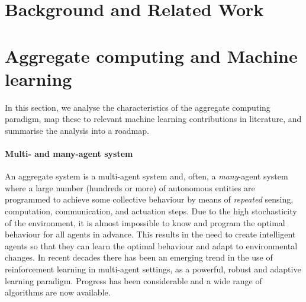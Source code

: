 \documentclass[
twocolumn,
]{ceurart}
\begin{document}

\section{Background and Related Work}

\section{Aggregate computing and Machine learning}

In this section,
 we analyse the characteristics of the aggregate computing paradigm,
 map these to relevant machine learning contributions in literature,
 and summarise the analysis into a roadmap.

\paragraph{Multi- and many-agent system}
%
An aggregate system is a multi-agent system
 and, often, a \emph{many}-agent system
 where a large number (hundreds or more)
 of autonomous entities are programmed to achieve 
 some collective behaviour by means of \emph{repeated} 
 sensing, computation, communication, and actuation steps.
%
Due to the high stochasticity of the environment,
it is almost impossible to know and
program the optimal behaviour for all agents in advance.
This results in the need to create intelligent agents
so that they can learn the optimal behaviour and adapt to environmental changes.
%
In recent decades there has been an emerging trend in the use of reinforcement learning
 in multi-agent settings, as a powerful, robust and adaptive learning paradigm.
 Progress has been considerable and a wide range of algorithms are now available.
\end{document}
